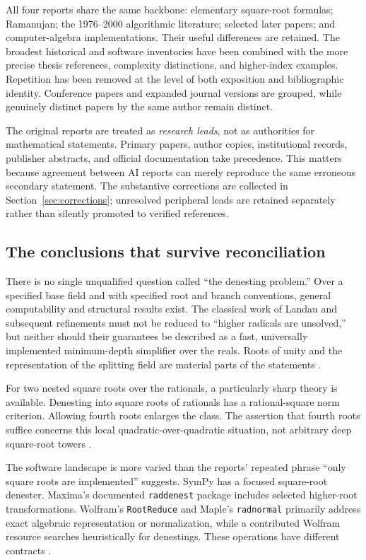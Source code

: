 \documentclass[11pt,letterpaper]{article}
\numberwithin{equation}{section}
\theoremstyle{definition}
\theoremstyle{remark}
\begin{document}
All four reports share the same backbone: elementary square-root formulas; Ramanujan; the 1976--2000 algorithmic literature; selected later papers; and computer-algebra implementations. Their useful differences are retained. The broadest historical and software inventories have been combined with the more precise thesis references, complexity distinctions, and higher-index examples. Repetition has been removed at the level of both exposition and bibliographic identity. Conference papers and expanded journal versions are grouped, while genuinely distinct papers by the same author remain distinct.

The original reports are treated as \emph{research leads}, not as authorities for mathematical statements. Primary papers, author copies, institutional records, publisher abstracts, and official documentation take precedence. This matters because agreement between AI reports can merely reproduce the same erroneous secondary statement. The substantive corrections are collected in Section~\ref{sec:corrections}; unresolved peripheral leads are retained separately rather than silently promoted to verified references.

\subsection{The conclusions that survive reconciliation}
There is no single unqualified question called ``the denesting problem.'' Over a specified base field and with specified root and branch conventions, general computability and structural results exist. The classical work of Landau and subsequent refinements must not be reduced to ``higher radicals are unsolved,'' but neither should their guarantees be described as a fast, universally implemented minimum-depth simplifier over the reals. Roots of unity and the representation of the splitting field are material parts of the statements \cite{landau,hornghuang,cotner,honsbeek}.

For two nested square roots over the rationals, a particularly sharp theory is available. Denesting into square roots of rationals has a rational-square norm criterion. Allowing fourth roots enlarges the class. The assertion that fourth roots suffice concerns this local quadratic-over-quadratic situation, not arbitrary deep square-root towers \cite{bfht,gkioulekas}.

The software landscape is more varied than the reports' repeated phrase ``only square roots are implemented'' suggests. SymPy has a focused square-root denester. Maxima's documented \texttt{raddenest} package includes selected higher-root transformations. Wolfram's \texttt{RootReduce} and Maple's \texttt{radnormal} primarily address exact algebraic representation or normalization, while a contributed Wolfram resource searches heuristically for denestings. These operations have different contracts \cite{sympy,maxima,wolframroot,wolframresource,maple}.
\end{document}
